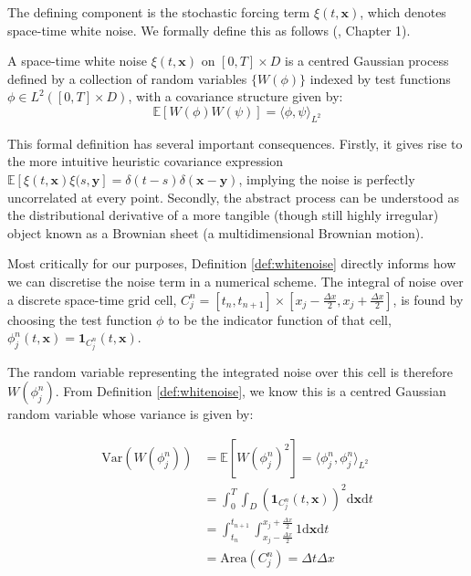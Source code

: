 The defining component is the stochastic forcing term $\xi(t,\mathbf{x})$, which denotes 
space-time white noise. We formally define this as follows (\cite{walsh2006introduction}, Chapter 1).

\begin{definition}
\label{def:whitenoise}
A space-time white noise $\xi(t,\mathbf{x})$ on $[0,T] \times D$ is a centred
Gaussian process defined by a collection of random variables 
$\{W(\phi)\}$ indexed by test functions $\phi \in L^2([0,T] \times D)$, 
with a covariance structure given by:
\[
\mathbb{E}[W(\phi)W(\psi)] = \langle \phi, \psi \rangle_{L^2}
\]
\end{definition}

This formal definition has several important consequences. Firstly, it gives rise 
to the more intuitive heuristic covariance expression 
$\mathbb{E}\left[\xi(t,\mathbf{x})\xi(s,\mathbf{y}\right] = 
\delta(t-s)\delta(\mathbf{x}-\mathbf{y})$, implying the noise is perfectly uncorrelated 
at every point. Secondly, the abstract process can be understood as the distributional
derivative of a more tangible (though still highly irregular) object
known as a Brownian sheet (a multidimensional Brownian motion).

Most critically for our purposes, Definition \ref{def:whitenoise} directly informs 
how we can discretise the noise term in a numerical scheme. The integral of 
noise over a discrete space-time grid cell, $C_j^n = [t_n, t_{n+1}] \times
[x_j - \frac{\Delta x}{2}, x_j + \frac{\Delta x}{2}]$, is found by choosing the test
function $\phi$ to be the indicator function of that cell, $\phi_j^n(t, \mathbf{x}) 
= \mathbf{1}_{C_j^n}(t, \mathbf{x})$. 

The random variable representing the integrated noise over this cell is therefore 
$W(\phi_j^n)$. From Definition \ref{def:whitenoise}, we know this is a centred Gaussian 
random variable whose variance is given by:

\begin{subequations}\label{eq:white_noise_integral_derivation}
    \begin{align*}
        \mathrm{Var}(W(\phi_j^n)) &= \mathbb{E}[W(\phi_j^n)^2] = 
        \langle \phi_j^n, \phi_j^n \rangle_{L^2} \\
        &= \int_0^T \int_D (\mathbf{1}_{C_j^n}(t, \mathbf{x}))^2 
        \mathrm{d}\mathbf{x} \mathrm{d}t \\
        &= \int_{t_n}^{t_{n+1}} \int_{x_j-\frac{\Delta x}{2}}^{x_j+\frac{\Delta x}{2}} 1
        \mathrm{d}\mathbf{x}\mathrm{d}t \\
        &= \text{Area}(C_j^n) = \Delta t \Delta x
    \end{align*}
\end{subequations}

